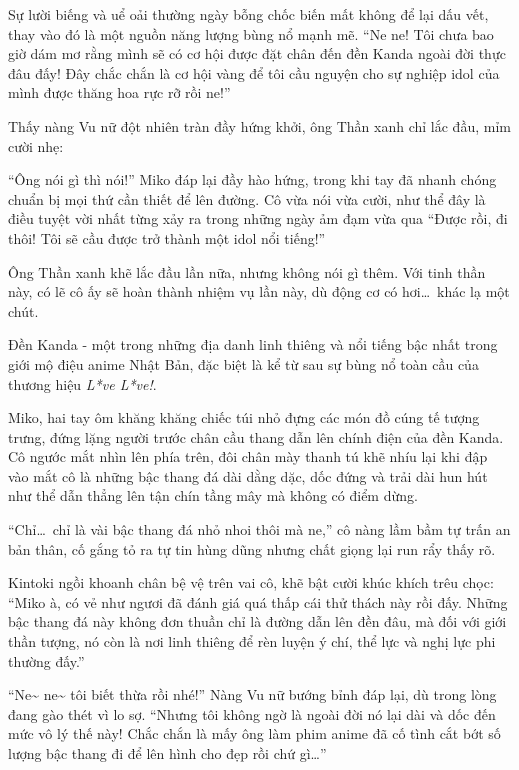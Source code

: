\documentclass[../main.tex]{subfiles}
\begin{document}
Sự lười biếng và uể oải thường ngày bỗng chốc biến mất không để lại dấu vết, thay vào đó là một nguồn năng lượng bùng nổ mạnh mẽ. ``Ne ne! Tôi chưa bao giờ dám mơ rằng mình sẽ có cơ hội được đặt chân đến đền Kanda ngoài đời thực đâu đấy! Đây chắc chắn là cơ hội vàng để tôi cầu nguyện cho sự nghiệp idol của mình được thăng hoa rực rỡ rồi ne!''


Thấy nàng Vu nữ đột nhiên tràn đầy hứng khởi, ông Thần xanh chỉ lắc đầu, mỉm cười nhẹ:


``Ông nói gì thì nói!'' Miko đáp lại đầy hào hứng, trong khi tay đã nhanh chóng chuẩn bị mọi thứ cần thiết để lên đường. Cô vừa nói vừa cười, như thể đây là điều tuyệt vời nhất từng xảy ra trong những ngày ảm đạm vừa qua ``Được rồi, đi thôi! Tôi sẽ cầu được trở thành một idol nổi tiếng!''


Ông Thần xanh khẽ lắc đầu lần nữa, nhưng không nói gì thêm. Với tinh thần này, có lẽ cô ấy sẽ hoàn thành nhiệm vụ lần này, dù động cơ có hơi\dots\ khác lạ một chút.

\ct

Đền Kanda - một trong những địa danh linh thiêng và nổi tiếng bậc nhất trong giới mộ điệu anime Nhật Bản, đặc biệt là kể từ sau sự bùng nổ toàn cầu của thương hiệu \textit{L*ve L*ve!}.

Miko, hai tay ôm khăng khăng chiếc túi nhỏ đựng các món đồ cúng tế tượng trưng, đứng lặng người trước chân cầu thang dẫn lên chính điện của đền Kanda. Cô ngước mắt nhìn lên phía trên, đôi chân mày thanh tú khẽ nhíu lại khi đập vào mắt cô là những bậc thang đá dài dằng dặc, dốc đứng và trải dài hun hút như thể dẫn thẳng lên tận chín tầng mây mà không có điểm dừng.


``Chỉ\dots\ chỉ là vài bậc thang đá nhỏ nhoi thôi mà ne,'' cô nàng lầm bầm tự trấn an bản thân, cố gắng tỏ ra tự tin hùng dũng nhưng chất giọng lại run rẩy thấy rõ.

Kintoki ngồi khoanh chân bệ vệ trên vai cô, khẽ bật cười khúc khích trêu chọc: ``Miko à, có vẻ như ngươi đã đánh giá quá thấp cái thử thách này rồi đấy. Những bậc thang đá này không đơn thuần chỉ là đường dẫn lên đền đâu, mà đối với giới thần tượng, nó còn là nơi linh thiêng để rèn luyện ý chí, thể lực và nghị lực phi thường đấy.''

``Ne\~{} ne\~{} tôi biết thừa rồi nhé!'' Nàng Vu nữ bướng bỉnh đáp lại, dù trong lòng đang gào thét vì lo sợ. ``Nhưng tôi không ngờ là ngoài đời nó lại dài và dốc đến mức vô lý thế này! Chắc chắn là mấy ông làm phim anime đã cố tình cắt bớt số lượng bậc thang đi để lên hình cho đẹp rồi chứ gì\dots''
\end{document}
